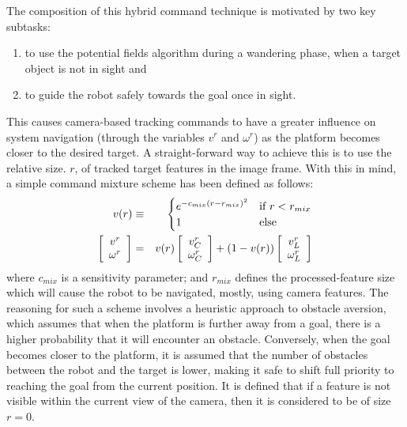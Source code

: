			The composition of this hybrid command technique is motivated by two key subtasks: 
				\begin{enumerate}
				\item to use the potential fields algorithm during a wandering phase, when a target object is not in sight and
				\item to guide the robot safely towards the goal once in sight.
				\end{enumerate}
			This causes camera-based tracking commands to have a greater influence on system navigation (through the variables $v^{r}$ and $\omega^{r}$) as the platform becomes closer to the desired target. A straight-forward way to achieve this is to use the relative size. $r$, of tracked target features in the image frame. With this in mind, a simple command mixture scheme has been defined as follows:
			\begin{eqnarray}
				v(r) &\equiv&
				\begin{cases}
				e^{ -c_{mix} \left( r - r_{mix}\right)^{2} } 	& \text{if } r < r_{mix}	\\
				1											& \text{else}
				\end{cases}
								\nonumber \\
						\left[\begin{array}{c} v^{r} 	\\ \omega^{r} 		\end{array} \right] &=& 	
				v(r)	\left[\begin{array}{c} v^{r}_{C}\\ \omega^{r}_{C} 	\end{array} \right] + 
				(1-v(r))\left[\begin{array}{c} v^{r}_{L}\\ \omega^{r}_{L} 	\end{array} \right] 
			\end{eqnarray}
			where $c_{mix}$ is a sensitivity parameter; and $r_{mix}$ defines the processed-feature size which will cause the robot to be navigated, mostly, using camera features. The reasoning for such a scheme involves a heuristic approach to obstacle aversion, which assumes that when the platform is further away from a goal, there is a higher probability that it will encounter an obstacle. Conversely, when the goal becomes closer to the platform, it is assumed that the number of obstacles between the robot and the target is lower, making it safe to shift full priority to reaching the goal from the current position. It is defined that if a feature is not visible within the current view of the camera, then it is considered to be of size $r=0$.


